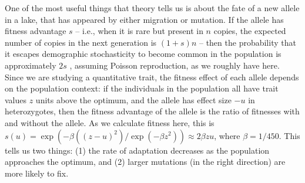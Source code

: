 \documentclass{article}
\begin{document}
One of the most useful things that theory tells us is about
the fate of a new allele in a lake, that has appeared by either migration or mutation. 
If the allele has fitness advantage $s$ -- 
i.e., when it is rare but present in $n$ copies,
the expected number of copies in the next generation is $(1+s)n$ --
then the probability that it escapes demographic stochasticity to become common in the population 
is approximately $2s$ \citep{lambert2006probability,haldane1927mathematical} 
, assuming Poisson reproduction, as we roughly have here. 
Since we are studying a quantitative trait, the fitness effect of each allele
depends on the population context:
if the individuals in the population all have trait values $z$ units above the optimum,
and the allele has effect size $-u$ in heterozygotes,
then the fitness advantage of the allele is the ratio of fitnesses with and without the allele.
As we calculate fitness here, this is
$s(u) = \exp(-\beta((z - u)^2) / \exp( - \beta z^2)) \approx 2 \beta z u$,
where $\beta = 1 / 450$. 
This tells us two things: (1) the rate of adaptation decreases as the population approaches the optimum, and (2) larger mutations (in the right direction) are more likely to fix.
\end{document}
